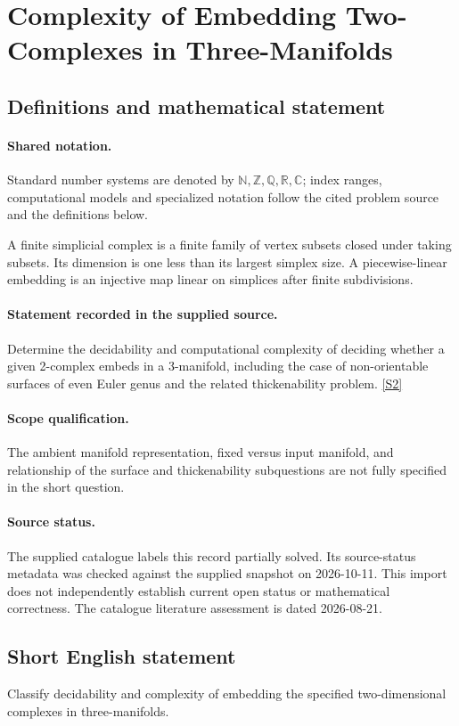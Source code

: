 \documentclass[11pt]{article}
\newcommand{\sref}[2]{\hyperlink{source:#1:#2}{[S#2]}}
\begin{document}
\section{Complexity of Embedding Two-Complexes in Three-Manifolds}\label{statement}

\subsection{Definitions and mathematical statement}

\paragraph{Shared notation.}Standard number systems are denoted by $\mathbb N,\mathbb Z,\mathbb Q,\mathbb R,\mathbb C$; index ranges, computational models and specialized notation follow the cited problem source and the definitions below.


A finite simplicial complex is a finite family of vertex subsets closed under taking subsets. Its dimension is one less than its largest simplex size. A piecewise-linear embedding is an injective map linear on simplices after finite subdivisions.
\paragraph{Statement recorded in the supplied source.}
Determine the decidability and computational complexity of deciding whether a given 2-complex embeds in a 3-manifold, including the case of non-orientable surfaces of even Euler genus and the related thickenability problem. \sref{statement}{2}
\paragraph{Scope qualification.}
The ambient manifold representation, fixed versus input manifold, and relationship of the surface and thickenability subquestions are not fully specified in the short question.
\paragraph{Source status.}
The supplied catalogue labels this record partially solved. Its source-status metadata was checked against the supplied snapshot on 2026-10-11. This import does not independently establish current open status or mathematical correctness. The catalogue literature assessment is dated 2026-08-21.
\subsection{Short English statement}
Classify decidability and complexity of embedding the specified two-dimensional complexes in three-manifolds.
\end{document}
